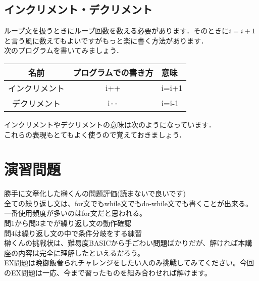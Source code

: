 \documentclass[a4j,titlepage,dvipdfmx]{jsarticle}   %
\newcommand{\codepath}{./code}
\newcommand{\articlepath}{./article}
\begin{document}
\subsection{インクリメント・デクリメント}
ループ文を扱うときにループ回数を数える必要があります．そのときに$i=i+1$と言う風に数えてもよいですがもっと楽に書く方法があります．\\
次のプログラムを書いてみましょう．\\

\begin{table}[htb]
\begin{tabular}{|c|c|l|}
\hline
名前      & \multicolumn{1}{l|}{プログラムでの書き方} & 意味    \\ \hline
インクリメント & i++                             & i=i+1 \\ \hline
		デクリメント  & i\verb"--"                            & i=i-1 \\ \hline
\end{tabular}
\end{table}
インクリメントやデクリメントの意味は次のようになっています．\\
これらの表現もとてもよく使うので覚えておきましょう．\\



\section{演習問題}
勝手に文章化した榊くんの問題評価(読まないで良いです)\\
全ての繰り返し文は、for文でもwhile文でもdo-while文でも書くことが出来る。\\
一番使用頻度が多いのはfor文だと思われる。\\
問1から問3までが繰り返し文の動作確認\\
問4は繰り返し文の中で条件分岐をする練習\\
榊くんの挑戦状は、難易度BASICから手ごわい問題ばかりだが、解ければ本講座の内容は完全に理解したといえるだろう。\\
EX問題は晩御飯奢られチャレンジをしたい人のみ挑戦してみてください。今回のEX問題は一応、今まで習ったものを組み合わせれば解けます。\\
\end{document}
